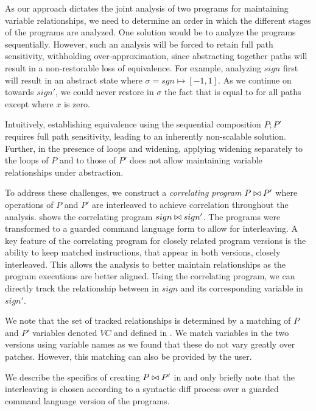 As our approach dictates the joint analysis of two programs for maintaining variable relationships, we need to determine an order in which the different stages of the programs are analyzed. One solution would be to analyze the programs sequentially. However, such an analysis will be forced to retain full path sensitivity, withholding over-approximation, since abstracting together paths will result in a non-restorable loss of equivalence. For example, analyzing $sign$ first will result in an abstract state where $\sigma = sgn \mapsto [-1,1]$. As we continue on towards $sign'$, we could never restore in $\sigma$ the fact that  is equal to  for all paths except where $x$ is zero.

Intuitively, establishing equivalence using the sequential composition $P;P'$ requires full path sensitivity, leading to an inherently non-scalable solution. Further, in the presence of loops and widening, applying widening separately to the loops of $P$ and to those of $P'$ does not allow maintaining variable relationships under abstraction.

 To address these challenges, we construct a \emph{correlating program} $P \bowtie P'$ where operations of $P$ and $P'$ are interleaved to achieve correlation throughout the analysis.  shows the correlating program $sign \bowtie sign'$. The programs were transformed to a guarded command language form to allow for interleaving. A key feature of the correlating program for closely related program versions is the ability to keep matched instructions, that appear in both versions, closely interleaved. This allows the analysis to better maintain relationships as the program executions are better aligned. Using the correlating program, we can directly track the relationship between  in $sign$ and its corresponding variable  in $sign'$.
%

We note that the set of tracked relationships is determined by a matching of $P$ and $P'$ variables denoted $VC$ and defined in . We match variables in the two versions using variable names as we found that these do not vary greatly over patches. However, this matching can also be provided by the user.

We describe the specifics of creating $P \bowtie P'$ in  and only briefly note that the interleaving is chosen according to a syntactic diff process over a guarded command language version of the programs.

